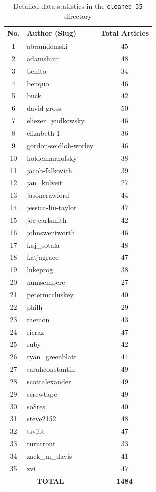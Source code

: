 \documentclass[12pt, a4paper]{article}
\begin{document}
\begin{table}[H]
\centering
\caption{Detailed data statistics in the \texttt{cleaned\_35} directory}
\label{tab:dataset_c35}
\begin{tabular}{|c|l|c|}
\hline
\textbf{No.} & \textbf{Author (Slug)} & \textbf{Total Articles} \\ \hline
1 & abramdemski & 45 \\ \hline
2 & adamshimi & 48 \\ \hline
3 & benito & 34 \\ \hline
4 & benquo & 46 \\ \hline
5 & buck & 42 \\ \hline
6 & david-gross & 50 \\ \hline
7 & eliezer\_yudkowsky & 46 \\ \hline
8 & elizabeth-1 & 36 \\ \hline
9 & gordon-seidloh-worley & 46 \\ \hline
10 & holdenkarnofsky & 38 \\ \hline
11 & jacob-falkovich & 39 \\ \hline
12 & jan\_kulveit & 27 \\ \hline
13 & jasoncrawford & 44 \\ \hline
14 & jessica-liu-taylor & 47 \\ \hline
15 & joe-carlsmith & 42 \\ \hline
16 & johnswentworth & 46 \\ \hline
17 & kaj\_sotala & 48 \\ \hline
18 & katjagrace & 47 \\ \hline
19 & lukeprog & 38 \\ \hline
20 & numsempere & 27 \\ \hline
21 & petermccluskey & 40 \\ \hline
22 & philh & 29 \\ \hline
23 & raemon & 43 \\ \hline
24 & ricraz & 47 \\ \hline
25 & ruby & 42 \\ \hline
26 & ryan\_greenblatt & 44 \\ \hline
27 & sarahconstantin & 49 \\ \hline
28 & scottalexander & 49 \\ \hline
29 & screwtape & 49 \\ \hline
30 & so8res & 40 \\ \hline
31 & steve2152 & 48 \\ \hline
32 & tsvibt & 47 \\ \hline
33 & turntrout & 33 \\ \hline
34 & zack\_m\_davis & 41 \\ \hline
35 & zvi & 47 \\ \hline
\multicolumn{2}{|c|}{\textbf{TOTAL}} & \textbf{1484} \\ \hline
\end{tabular}
\end{table}
\end{document}

